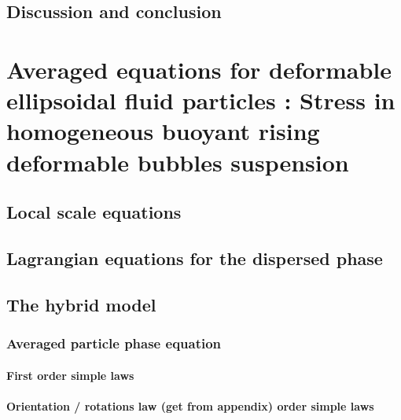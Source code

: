 \documentclass[12pt,a4paper,openany]{My_book}
\begin{document}
\section{Discussion and conclusion}


\chapter{Averaged equations for deformable ellipsoidal fluid particles : Stress in homogeneous buoyant rising deformable bubbles suspension }
\localtableofcontents


\section{Local scale equations}


\section{Lagrangian equations for the dispersed phase}

% 
% 

% 

\section{The hybrid model}
\subsection{Averaged particle phase equation}
\subsubsection{First order simple laws}
\subsubsection{Orientation / rotations law (get from appendix) order simple laws}
\end{document}
